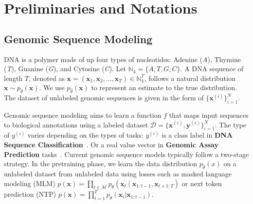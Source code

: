
\section{Preliminaries and Notations}


\subsection{Genomic Sequence Modeling} 
DNA is a polymer made of up four types of nucleotides: Adenine (\textit{A}), Thymine (\textit{T}), Guanine (\textit{G}), and Cytosine (\textit{C}). Let $ \mathbb{N}_4 = \{A, T, G, C\}$. A DNA sequence of length $T$, denoted as $\mathbf{x} = {(\mathbf{x}_1, \mathbf{x}_2,...,\mathbf{x}_T)} \in \mathbb{N}^T_4$, follows a natural distribution $\mathbf{x} \sim p_\theta(\mathbf{x})$. We use $p_{\hat{\theta}}(\mathbf{x})$ to represent an estimate to the true distribution. The dataset of unlabeled genomic sequences is given in the form of \( \{\mathbf{x}^{(i)}\}_{i=1}^N\).

Genomic sequence modeling aims to learn a function $f$ that maps input sequences to biological annotations using a labeled dataset \(\mathcal{D} = \{\mathbf{x}^{(i)}, \mathbf{y}^{(i)}\}_{i=1}^N\). The type of $y^{(i)}$ varies depending on the types of tasks: $y^{(i)}$ is a class label in \textbf{DNA Sequence Classification}~\cite{grevsova2023genomic,dalla2024nucleotide}. Or a real value vector in \textbf{Genomic Assay Prediction} tasks~\cite{avsec2021effective,linder2025predicting}. Current genomic sequence models typically follow a two-stage strategy. In the pretraining phase, we learn the data distribution $p_{\hat{\theta}}(x)$ on a unlabeled dataset from unlabeled data using losses such as masked language modeling (MLM)
$p(\mathbf{x}) = \prod_{t \in \mathcal{M}} p_\theta(\mathbf{x}_t \mid \mathbf{x}_{1:t-1}, \mathbf{x}_{t+1:T})$ 
or next token prediction (NTP) $p(\mathbf{x}) = \prod_{t=1}^{T}p_\theta(\mathbf{x}_t | \mathbf{x}_{1:t-1})$. 




